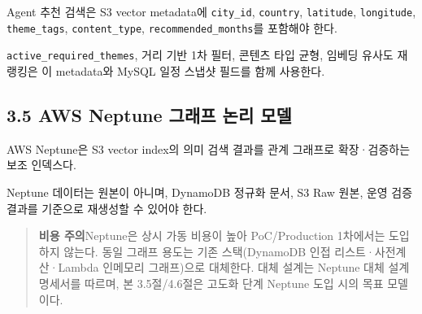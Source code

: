 \documentclass[12pt,a4paper]{article}
\newcommand{\DocNeedspace}[1]{\par\ifdim\dimexpr\pagegoal-\pagetotal\relax<#1\newpage\fi}
\begin{document}
\DocNeedspace{3\baselineskip}
Agent 추천 검색은 S3 vector metadata에 \texttt{city\_\allowbreak{}id}, \texttt{country}, \texttt{latitude}, \texttt{longitude}, \texttt{theme\_\allowbreak{}tags}, \texttt{content\_\allowbreak{}type}, \texttt{recommended\_\allowbreak{}months}를 포함해야 한다.

\DocNeedspace{3\baselineskip}
\texttt{active\_\allowbreak{}required\_\allowbreak{}themes}, 거리 기반 1차 필터, 콘텐츠 타입 균형, 임베딩 유사도 재랭킹은 이 metadata와 MySQL 일정 스냅샷 필드를 함께 사용한다.


\DocNeedspace{24\baselineskip}
\subsection*{3.5 AWS Neptune 그래프 논리 모델}


\DocNeedspace{3\baselineskip}
AWS Neptune은 S3 vector index의 의미 검색 결과를 관계 그래프로 확장·검증하는 보조 인덱스다.

\DocNeedspace{3\baselineskip}
Neptune 데이터는 원본이 아니며, DynamoDB 정규화 문서, S3 Raw 원본, 운영 검증 결과를 기준으로 재생성할 수 있어야 한다.


\begin{quote}
\textbf{비용 주의}\quad Neptune은 상시 가동 비용이 높아 PoC/Production 1차에서는 도입하지 않는다.
동일 그래프 용도는 기존 스택(DynamoDB 인접 리스트·사전계산·Lambda 인메모리 그래프)으로 대체한다.
대체 설계는 Neptune 대체 설계 명세서를 따르며, 본 3.5절/4.6절은 고도화 단계 Neptune 도입 시의 목표 모델이다.
\end{quote}
\end{document}
